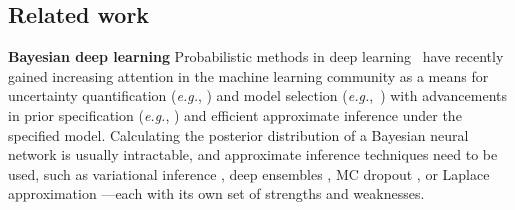 \documentclass{article} %
\makeatletter
\newcommand{\eg}{\textit{e.g.\@}\xspace}
\makeatother
\begin{document}
\subsection{Related work}
\label{sec:related}
%
\textbf{Bayesian deep learning}
Probabilistic methods in deep learning~\cite{Wilson:ensembles,neal1995bayesian} have recently gained increasing attention in the machine learning community as a means for uncertainty quantification (\eg, \cite{kendall2017what,wilson2020bayes}) and model selection (\eg,~\cite{immer2021scalable,antoran2022marginal}) with advancements in prior specification (\eg, \cite{cho2009kernel,meronen2020stationary,meronen2021periodic,fortuin2021bayesian,nalisnick2018do}) and efficient approximate inference under the specified model.
Calculating the posterior distribution of a Bayesian neural network is usually intractable, and approximate inference techniques need to be used, such as variational inference \cite{blei2017variational}, deep ensembles \cite{lakshminarayanan2017simple}, MC dropout \cite{gal2016dropout}, or Laplace approximation \cite{ritter2018kfac,kristiadi2020being,immer2021improving}---each with its own set of strengths and weaknesses.


\end{document}
